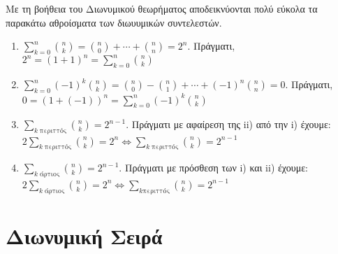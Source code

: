 Με τη βοήθεια του Διωνυμικού θεωρήματος αποδεικνύονται πολύ εύκολα τα παρακάτω 
αθροίσματα των διωυυμικών συντελεστών.
\begin{prop}
\item {}
  \begin{enumerate}
    \item $ \sum_{k=0}^{n} \binom{n}{k} = \binom{n}{0} +\cdots+ \binom{n}{n} =  2^{n} $. 
      Πράγματι, $ 2^{n}=(1+1)^{n} =
      \sum_{k=0}^{n} \binom{n}{k} $
    \item $ \sum_{k=0}^{n} (-1)^k \binom{n}{k} = \binom{n}{0} - \binom{n}{1} +\cdots
      +(-1)^{n} \binom{n}{n} = 0 $. Πράγματι, $ 0 = (1+(-1))^{n} = 
      \sum_{k=0}^{n} (-1)^{k}\binom{n}{k} $
    \item $ \sum_{k \; \text{περιττός}} \binom{n}{k} = 2^{n-1} $. 
      Πράγματι με αφαίρεση της ii) από την i) έχουμε: $ 2 \sum_{k \; \text{περιττός}} 
      \binom{n}{k} = 2^{n} \Leftrightarrow \sum_{k \; \text{περιττός}}
      \binom{n}{k} = 2^{n-1} $
    \item $ \sum_{k \; \text{άρτιος}} \binom{n}{k} = 2^{n-1} $. 
      Πράγματι με πρόσθεση των i) και ii) έχουμε: $ 2 \sum_{k \; \text{άρτιος}}
      \binom{n}{k} = 2^{n} \Leftrightarrow \sum_{k \text{περιττός}} \binom{n}{k}
      = 2^{n-1} $
  \end{enumerate}
\end{prop}



\section*{Διωνυμική Σειρά}


